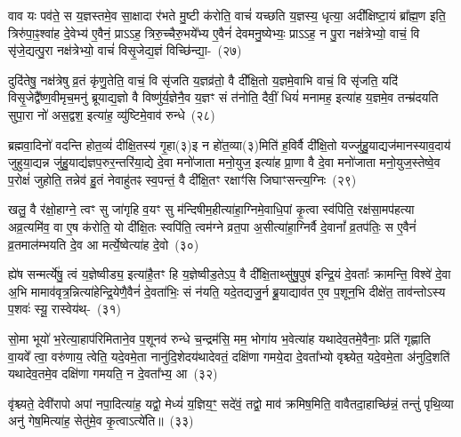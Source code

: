 वाव यः पव॑ते॒ स य॒ज्ञस्तमे॒व सा॒क्षादा र॑भते मु॒ष्टी क॑रोति॒ वाचं॑ यच्छति य॒ज्ञस्य॒ धृत्या॒ अदी᳚क्षिष्टा॒यं ब्रा᳚ह्म॒ण इति॒ त्रिरु॑पा॒ꣴ॒श्वा॑ह दे॒वेभ्य॑ ए॒वैनं॒ प्रा\-ऽऽ\-ह॒ त्रिरु॒च्चैरु॒भये᳚भ्य ए॒वैनं॑ देवमनु॒ष्येभ्यः॒ प्रा\-ऽऽ\-ह॒ न पु॒रा नक्ष॑त्रेभ्यो॒ वाचं॒ वि सृ॑जे॒द्यत्पु॒रा नक्ष॑त्रेभ्यो॒ वाचं॑ विसृ॒जेद्य॒ज्ञं विच्छि॑न्द्या॒-~(२७)\ip

दुदि॑तेषु॒ नक्ष॑त्रेषु व्र॒तं कृ॑णु॒तेति॒ वाचं॒ वि सृ॑जति य॒ज्ञव्र॑तो॒ वै दी᳚क्षि॒तो य॒ज्ञमे॒वाभि वाचं॒ वि सृ॑जति॒ यदि॑ विसृ॒जेद्वै᳚ष्ण॒वीमृच॒मनु॑ ब्रूयाद्य॒ज्ञो वै विष्णु॑र्य॒ज्ञेनै॒व य॒ज्ञꣳ सं त॑नोति॒ दैवीं॒ धियं॑ मनामह॒ इत्या॑ह य॒ज्ञमे॒व तन्म्र॑दयति सुपा॒रा नो॑ अस॒द्वश॒ इत्या॑ह॒ व्यु॑ष्टिमे॒वाव॑ रुन्धे~(२८)\ip

ब्रह्मवा॒दिनो॑ वदन्ति होत॒व्यं॑ दीक्षि॒तस्य॑ गृ॒हा(३)इ न हो॑त॒व्या(३)मिति॑ ह॒विर्वै दी᳚क्षि॒तो यज्जु॑हु॒याद्यज॑मानस्याव॒दाय॑ जुहुया॒द्यन्न जु॑हु॒याद्य॑ज्ञप॒रुर॒न्तरि॑या॒द्ये दे॒वा मनो॑जाता मनो॒युज॒ इत्या॑ह प्रा॒णा वै दे॒वा मनो॑जाता मनो॒युज॒स्तेष्वे॒व प॒रोक्षं॑ जुहोति॒ तन्नेव॑ हु॒तं नेवाहु॑तꣴ स्व॒पन्तं॒ वै दी᳚क्षि॒तꣳ रक्षाꣳ॑सि जिघाꣳसन्त्य॒ग्निः~(२९)\ip

खलु॒ वै र॑क्षो॒हाग्ने॒ त्वꣳ सु जा॑गृहि व॒यꣳ सु म॑न्दिषीम॒हीत्या॑हा॒ग्निमे॒वाधि॒पां कृ॒त्वा स्व॑पिति॒ रक्ष॑सा॒मप॑हत्या अव्र॒त्यमि॑व॒ वा ए॒ष क॑रोति॒ यो दी᳚क्षि॒तः स्वपि॑ति॒ त्वम॑ग्ने व्रत॒पा अ॒सीत्या॑हा॒ग्निर्वै दे॒वानां᳚ व्र॒तप॑तिः॒ स ए॒वैनं॑ व्र॒तमाल॑म्भयति दे॒व आ मर्त्ये॒ष्वेत्या॑ह दे॒वो~(३०)\ip

ह्ये॑ष सन्मर्त्ये॑षु॒ त्वं य॒ज्ञेष्वीड्य॒ इत्या॑है॒तꣳ हि य॒ज्ञेष्वीड॒ते\-ऽप॒ वै दी᳚क्षि॒ताथ्सु॑षु॒पुष॑ इन्द्रि॒यं दे॒वताः᳚ क्रामन्ति॒ विश्वे॑ दे॒वा अ॒भि मामाव॑वृत्र॒न्नित्या॑हेन्द्रि॒येणै॒वैनं॑ दे॒वता॑भिः॒ सं न॑यति॒ यदे॒तद्यजु॒र्न ब्रू॒याद्याव॑त ए॒व प॒शून॒भि दीक्षे॑त॒ ताव॑न्तो\-ऽस्य प॒शवः॑ स्यू॒ रास्वेय॑थ्-~(३१)\ip

सो॒मा भूयो॑ भ॒रेत्या॒हाप॑रिमिताने॒व प॒शूनव॑ रुन्धे च॒न्द्रम॑सि॒ मम॒ भोगा॑य भ॒वेत्या॑ह यथादेव॒तमे॒वैनाः॒ प्रति॑ गृह्णाति वा॒यवे᳚ त्वा॒ वरु॑णाय॒ त्वेति॒ यदे॒वमे॒ता नानु॑दि॒शेदय॑थादेवतं॒ दक्षि॑णा गमये॒दा दे॒वता᳚भ्यो वृश्च्येत॒ यदे॒वमे॒ता अ॑नुदि॒शति॑ यथादेव॒तमे॒व दक्षि॑णा गमयति॒ न दे॒वता᳚भ्य॒ आ~(३२)\ip

वृ॑श्च्यते॒ देवी॑रापो अपां नपा॒दित्या॑ह॒ यद्वो॒ मेध्यं॑ य॒ज्ञिय॒ꣳ॒ सदे॑वं॒ तद्वो॒ माव॑ क्रमिष॒मिति॒ वावैतदा॒हाच्छि॑न्नं॒ तन्तुं॑ पृथि॒व्या अनु॑ गेष॒मित्या॑ह॒ सेतु॑मे॒व कृ॒त्वा\-ऽत्ये॑ति॥~(३३)\ip

{}

